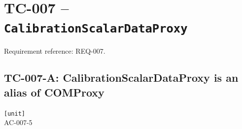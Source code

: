 \section{TC-007 -- \texttt{CalibrationScalarDataProxy}}
\label{sec:tc007}

Requirement reference: REQ-007.

\subsection{TC-007-A: CalibrationScalarDataProxy is an alias of COMProxy}

\begin{tcbox}
 \texttt{[unit]}\\
 AC-007-5

\medskip
\given{}
\end{tcbox}